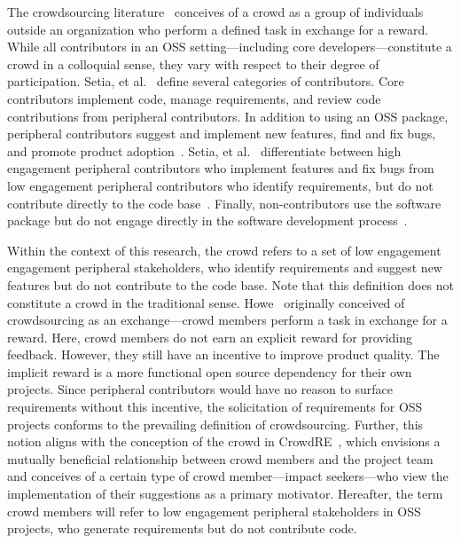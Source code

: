 The crowdsourcing literature~\cite{howe, howe2, brabham, brabham2} conceives of a crowd as a group of individuals outside an organization who perform a defined task in exchange for a reward. While all contributors in an OSS setting---including core developers---constitute a crowd in a colloquial sense, they vary with respect to their degree of participation. Setia, et al.~\cite{setia} define several categories of contributors. Core contributors implement code, manage requirements, and review code contributions from peripheral contributors. In addition to using an OSS package, peripheral contributors suggest and implement new features, find and fix bugs, and promote product adoption~\cite{setia}. Setia, et al.~\cite{setia} differentiate between high engagement peripheral contributors who implement features and fix bugs from low engagement peripheral contributors who identify requirements, but do not contribute directly to the code base~\cite{setia}. Finally, non-contributors use the software package but do not engage directly in the software development process~\cite{setia}.  

Within the context of this research, the crowd refers to a set of low engagement engagement peripheral stakeholders, who identify requirements and suggest new features but do not contribute to the code base. Note that this definition does not constitute a crowd in the traditional sense. Howe~\cite{howe} originally conceived of crowdsourcing as an exchange---crowd members perform a task in exchange for a reward. Here, crowd members do not earn an explicit reward for providing feedback. However, they still have an incentive to improve product quality. The implicit reward is a more functional open source dependency for their own projects. Since peripheral contributors would have no reason to surface requirements without this incentive, the solicitation of requirements for OSS projects conforms to the prevailing definition of crowdsourcing. Further, this notion aligns with the conception of the crowd in CrowdRE~\cite{groen}, which envisions a mutually beneficial relationship between crowd members and the project team and conceives of a certain type of crowd member---impact seekers---who view the implementation of their suggestions as a primary motivator. Hereafter, the term crowd members will refer to low engagement peripheral stakeholders in OSS projects, who generate requirements but do not contribute code.

